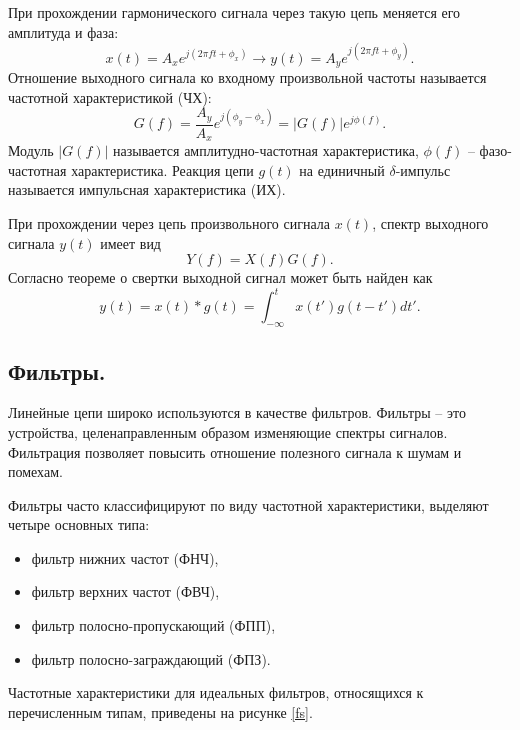 \documentclass[a4paper,14pt]{extarticle}
\begin{document}
При прохождении гармонического сигнала через такую цепь меняется его амплитуда и фаза: 
\begin{equation*}
x(t) = A_x e^{j (2 \pi f t + \phi_x)} \rightarrow y(t) = A_y e^{j (2 \pi f t + \phi_y)}.
\end{equation*} 
Отношение выходного сигнала ко входному произвольной частоты называется частотной характеристикой (ЧХ):
\begin{equation*}
G(f) = \frac{A_y}{A_x} e^{j (\phi_y - \phi_x)} = |G(f)|e^{j \phi(f)}.
\end{equation*}
Модуль $|G(f)|$ называется амплитудно-частотная характеристика, $\phi(f)$ -- фазо-частотная характеристика.
Реакция цепи $g(t)$ на единичный $\delta$-импульс называется импульсная характеристика (ИХ).

При прохождении через цепь произвольного сигнала $x(t)$, спектр выходного сигнала $y(t)$ имеет вид
\begin{equation*}
Y(f) = X(f) G(f).
\end{equation*}
Согласно теореме о свертки выходной сигнал может быть найден как 
\begin{equation*}
y(t) = x(t) * g(t) = \int_{-\infty}^{t} x(t')g(t - t') dt'.
\end{equation*}   


\subsection{Фильтры.}
Линейные цепи широко используются в качестве фильтров. Фильтры -- это устройства, целенаправленным образом изменяющие спектры сигналов. Фильтрация позволяет повысить отношение полезного сигнала к шумам и помехам.

Фильтры часто классифицируют по виду частотной характеристики, выделяют четыре основных типа:
\begin{itemize}
\setlength\itemsep{-0.4em}
\item фильтр нижних частот (ФНЧ),
\item фильтр верхних частот (ФВЧ),
\item фильтр полосно-пропускающий (ФПП),
\item фильтр полосно-заграждающий (ФПЗ).
\end{itemize}
Частотные характеристики для идеальных фильтров, относящихся к перечисленным типам, приведены на рисунке \ref{fs}.
\end{document}
